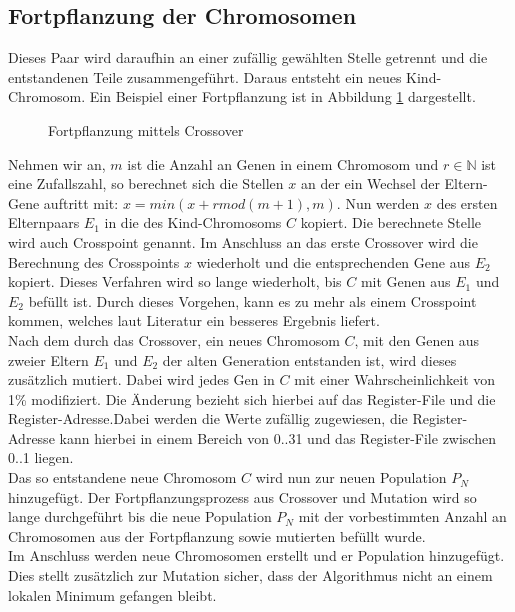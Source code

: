 \subsection{Fortpflanzung der Chromosomen}
Dieses Paar wird daraufhin an einer zufällig gewählten Stelle getrennt und die entstandenen Teile zusammengeführt. Daraus entsteht ein neues Kind-Chromosom. Ein Beispiel einer Fortpflanzung ist in Abbildung \ref{fig:crossover} dargestellt.
\begin{figure}[htbp] 
	\centering
	
	\caption{Fortpflanzung mittels Crossover}
	\label{fig:crossover}
\end{figure}
Nehmen wir an, $m$ ist die Anzahl an Genen in einem Chromosom und $r \in \mathbb{N}$ ist eine Zufallszahl, so berechnet sich die Stellen $x$ an der ein Wechsel der Eltern-Gene auftritt mit: $x= min(x+r mod(m+1),m)$. Nun werden $x$ des ersten Elternpaars $E_1$ in die des Kind-Chromosoms $C$ kopiert. Die berechnete Stelle wird auch Crosspoint genannt. Im Anschluss an das erste Crossover wird die Berechnung des Crosspoints $x$ wiederholt und die entsprechenden Gene aus $E_2$ kopiert. Dieses Verfahren wird so lange wiederholt, bis $C$ mit Genen aus $E_1$ und $E_2$ befüllt ist. Durch dieses Vorgehen, kann es zu mehr als einem Crosspoint kommen, welches laut Literatur ein besseres Ergebnis liefert.\cite{reeves2003genetic} \\
Nach dem durch das Crossover, ein neues Chromosom $C$, mit den Genen aus zweier Eltern $E_1$ und $E_2$ der alten Generation entstanden ist, wird dieses zusätzlich mutiert. Dabei wird jedes Gen in $C$ mit einer Wahrscheinlichkeit von 1\% modifiziert. Die Änderung bezieht sich hierbei auf das Register-File und die Register-Adresse.Dabei werden die Werte zufällig zugewiesen, die Register-Adresse kann hierbei in einem Bereich von 0..31 und das Register-File zwischen 0..1 liegen.\\
Das so entstandene neue Chromosom $C$ wird nun zur neuen Population $P_N$ hinzugefügt. Der Fortpflanzungsprozess aus Crossover und Mutation wird so lange durchgeführt bis die neue Population $P_N$ mit der vorbestimmten Anzahl an Chromosomen aus der Fortpflanzung sowie mutierten befüllt wurde.\\
Im Anschluss werden neue Chromosomen erstellt und er Population hinzugefügt. Dies stellt zusätzlich zur Mutation sicher, dass der Algorithmus nicht an einem lokalen Minimum gefangen bleibt. 

